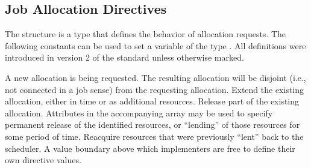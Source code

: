 %

%

%

%

%

%


\subsection{Job Allocation Directives}

The  structure is a  type that defines the behavior of allocation requests.
The following constants can be used to set a variable of the type . All definitions were introduced in version 2 of the standard unless otherwise marked.

\begin{constantdesc}
%
A new allocation is being requested.
The resulting allocation will be disjoint (i.e., not connected in a job sense) from the requesting allocation.
%
Extend the existing allocation, either in time or as additional resources.
%
Release part of the existing allocation.
Attributes in the accompanying  array may be used to specify permanent release of the identified resources, or ``lending'' of those resources for some period of time.
%
Reacquire resources that were previously ``lent'' back to the scheduler.
%
A value boundary above which implementers are free to define their own directive values.
%
\end{constantdesc}



